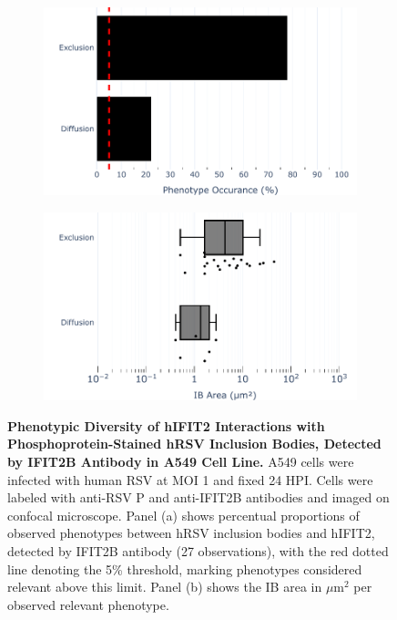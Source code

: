 \begin{figure}
    \begin{subfigure}{0.495\textwidth}
        \caption{}
        \includegraphics[width=1\linewidth]{08. Chapter 3/Figs/02. Infection/02. IFIT2/02. IFIT2B/04. bar_i2b_a549-p.pdf} 
    \end{subfigure}
    \begin{subfigure}{0.495\textwidth}
        \caption{}
        \includegraphics[width=1\linewidth]{08. Chapter 3/Figs/02. Infection/02. IFIT2/02. IFIT2B/05. box_i2b_a549-p.pdf}
    \end{subfigure}
    \caption[Phenotypic Diversity of hIFIT2 Interactions with Phosphoprotein-Stained hRSV Inclusion Bodies, Detected by IFIT2B Antibody in A549 Cell Line.]{\textbf{Phenotypic Diversity of hIFIT2 Interactions with Phosphoprotein-Stained hRSV Inclusion Bodies, Detected by IFIT2B Antibody in A549 Cell Line.} A549 cells were infected with human RSV at MOI 1 and fixed 24 HPI. Cells were labeled with anti-RSV P and anti-IFIT2B antibodies and imaged on confocal microscope. Panel (a) shows percentual proportions of observed phenotypes between hRSV inclusion bodies and hIFIT2, detected by IFIT2B antibody (27 observations), with the red dotted line denoting the 5\% threshold, marking phenotypes considered relevant above this limit. Panel (b) shows the IB area in \(\mu \mbox{m}^2\) per observed relevant phenotype.}
    \label{fig:Phenotypic Diversity of hIFIT2 Interactions with Phosphoprotein-Stained hRSV Inclusion Bodies, Detected by IFIT2B Antibody in A549 Cell Line}
\end{figure}

